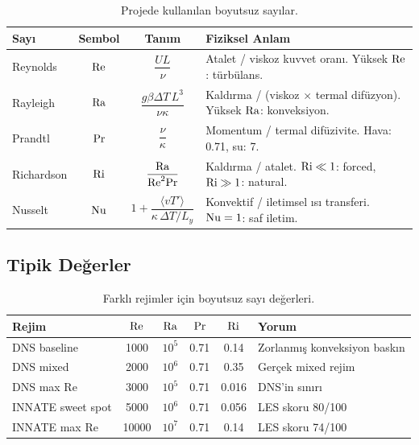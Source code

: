 \begin{table}[H]
\centering
\caption{Projede kullanılan boyutsuz sayılar.}
\label{tab:boyutsuz}
\renewcommand{\arraystretch}{1.4}
\begin{tabular}{lccp{6cm}}
\toprule
\textbf{Sayı} & \textbf{Sembol} & \textbf{Tanım} & \textbf{Fiziksel Anlam} \\
\midrule
Reynolds
    & $\mathrm{Re}$
    & $\dfrac{UL}{\nu}$
    & Atalet / viskoz kuvvet oranı. Yüksek $\mathrm{Re}$: türbülans. \\
Rayleigh
    & $\mathrm{Ra}$
    & $\dfrac{g\beta\Delta T\, L^3}{\nu \kappa}$
    & Kaldırma / (viskoz $\times$ termal difüzyon). Yüksek $\mathrm{Ra}$: konveksiyon. \\
Prandtl
    & $\mathrm{Pr}$
    & $\dfrac{\nu}{\kappa}$
    & Momentum / termal difüzivite. Hava: 0.71, su: 7. \\
Richardson
    & $\mathrm{Ri}$
    & $\dfrac{\mathrm{Ra}}{\mathrm{Re}^2 \mathrm{Pr}}$
    & Kaldırma / atalet. $\mathrm{Ri} \ll 1$: forced, $\mathrm{Ri} \gg 1$: natural. \\
Nusselt
    & $\mathrm{Nu}$
    & $1 + \dfrac{\langle v T' \rangle}{\kappa\,\Delta T / L_y}$
    & Konvektif / iletimsel ısı transferi. $\mathrm{Nu}=1$: saf iletim. \\
\bottomrule
\end{tabular}
\end{table}

\subsection{Tipik Değerler}

\begin{table}[H]
\centering
\caption{Farklı rejimler için boyutsuz sayı değerleri.}
\label{tab:tipik_degerler}
\begin{tabular}{lccccl}
\toprule
\textbf{Rejim} & $\mathrm{Re}$ & $\mathrm{Ra}$ & $\mathrm{Pr}$ & $\mathrm{Ri}$ & \textbf{Yorum} \\
\midrule
DNS baseline     & 1000  & $10^5$ & 0.71 & 0.14  & Zorlanmış konveksiyon baskın \\
DNS mixed        & 2000  & $10^6$ & 0.71 & 0.35  & Gerçek mixed rejim \\
DNS max Re       & 3000  & $10^5$ & 0.71 & 0.016 & DNS'in sınırı \\
INNATE sweet spot & 5000 & $10^6$ & 0.71 & 0.056 & LES skoru 80/100 \\
INNATE max Re    & 10000 & $10^7$ & 0.71 & 0.14  & LES skoru 74/100 \\
\bottomrule
\end{tabular}
\end{table}


